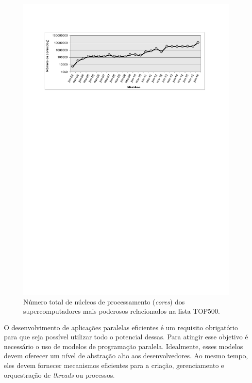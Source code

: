 \documentclass{SBCbookchapter}
\begin{document}
\begin{figure}[h]
\begin{center}
\includegraphics[width=13cm, height=!]{figs/cores-top500.pdf}
\caption{Número total de núcleos de processamento (\emph{cores}) dos supercomputadores mais poderosos relacionados na lista TOP500.}\label{fig:top500}
\end{center}
\end{figure}

O desenvolvimento de aplicações paralelas eficientes é um requisito obrigatório para que seja possível utilizar todo o potencial dessas. Para atingir esse objetivo é necessário o uso de modelos de programação paralela. Idealmente, esses modelos devem oferecer um nível de abstração alto aos desenvolvedores. Ao mesmo tempo, eles devem fornecer mecanismos eficientes para a criação, gerenciamento e orquestração de \textit{threads} ou processos.
\end{document}
